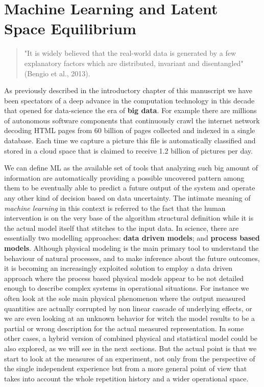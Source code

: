 \chapter{Machine Learning and Latent Space Equilibrium}
%
\begin{quote}
"It is widely believed that the real-world data is generated by a few explanatory factors which are distributed, invariant and disentangled" (Bengio et al., 2013).
\end{quote}
%
As previously described in the introductory chapter of this manuscript we have been spectators of a deep advance in the computation technology in this decade that opened for data-science the era of \textbf{big data}. For example there are millions of autonomous software components that continuously crawl the internet network decoding HTML pages from 60 billion of pages collected and indexed in a single database. Each time we capture a picture this file is automatically classified and stored in a cloud space that is claimed to receive 1.2 billion of pictures per day. 

We can define ML as the available set of tools that analyzing such big amount of information are automatically providing a possible uncovered pattern among them to be eventually able to predict a future output of the system and operate any other kind of decision based on data uncertainty. The intimate meaning of \textit{machine learning} in this context is referred to the fact that the human intervention is on the very base of the algorithm structural definition while it is the actual model itself that stitches to the input data.  
%
In science, there are essentially two modelling approaches: \textbf{data driven models}; and \textbf{process based models}.
Although physical modeling is the main primary tool to understand the behaviour of natural processes, and to make inference about the future outcomes, it is becoming an increasingly exploited solution to employ a data driven approach where the process based physical models appear to be not detailed enough to describe complex systems in operational situations. For instance we often look at the sole main physical phenomenon where the output measured quantities are actually corrupted by non linear cascade of underlying effects, or we are even looking at an unknown behavior for witch the model results to be a partial or wrong description for the actual measured representation. 
In some other cases, a hybrid version of combined physical and statistical model could be also explored, as we will see in the next sections. But the actual point is that we start to look at the measures of an experiment, not only from the perspective of the single independent experience but from a more general point of view that takes into account the whole repetition history and a wider operational space.  



